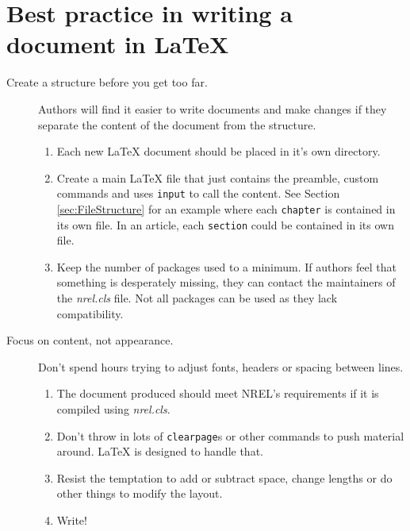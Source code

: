\section{Best practice in writing a document in LaTeX}
\begin{description}
\item[Create a structure before you get too far.] Authors will find it easier to write documents and make changes if they separate the content of the document from the structure.
\begin{enumerate}
\item Each new LaTeX document should be placed in it's own directory. 
\item Create a main LaTeX file that just contains the preamble, custom commands and uses \texttt{input} to call the content. See Section \ref{sec:FileStructure} for an example where each \texttt{chapter} is contained in its own file. In an article, each \texttt{section} could be contained in its own file.
\item Keep the number of packages used to a minimum. If authors feel that something is desperately missing, they can contact the maintainers of the \emph{nrel.cls} file. Not all packages can be used as they lack compatibility.
\end{enumerate}
\item[Focus on content, not appearance.] Don't spend hours trying to adjust fonts, headers or spacing between lines. 
\begin{enumerate}
\item The document produced should meet NREL's requirements if it is compiled using \emph{nrel.cls}. 
\item Don't throw in lots of \texttt{clearpage}s or other commands to push material around. LaTeX is designed to handle that. 
\item Resist the temptation to add or subtract space, change lengths or do other things to modify the layout. 
\item Write!
\end{enumerate}
\end{description}
